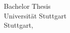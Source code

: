 \thispagestyle{empty}

\begin{titlepage}

\begin{center}
	\Huge{Bachelor Thesis}\\%
	\vspace{10mm}%
	\Large{Universität Stuttgart}\\
	\vspace{20mm}
	Stuttgart, \HANDINDATE
\end{center}

\end{titlepage}